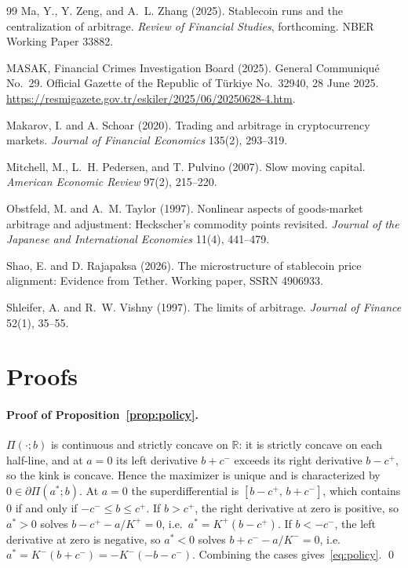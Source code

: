 \documentclass[12pt]{article}
\theoremstyle{definition}
\theoremstyle{remark}
\begin{document}
\begin{thebibliography}{99}
Ma, Y., Y. Zeng, and A.~L. Zhang (2025). Stablecoin runs and the centralization of arbitrage. \emph{Review of Financial Studies}, forthcoming. NBER Working Paper 33882.

MASAK, Financial Crimes Investigation Board (2025). General Communiqu\'e No.~29. Official Gazette of the Republic of T\"urkiye No.~32940, 28 June 2025. \url{https://resmigazete.gov.tr/eskiler/2025/06/20250628-4.htm}.

Makarov, I. and A. Schoar (2020). Trading and arbitrage in cryptocurrency markets. \emph{Journal of Financial Economics} 135(2), 293--319.

Mitchell, M., L.~H. Pedersen, and T. Pulvino (2007). Slow moving capital. \emph{American Economic Review} 97(2), 215--220.

Obstfeld, M. and A.~M. Taylor (1997). Nonlinear aspects of goods-market arbitrage and adjustment: Heckscher's commodity points revisited. \emph{Journal of the Japanese and International Economies} 11(4), 441--479.

Shao, E. and D. Rajapaksa (2026). The microstructure of stablecoin price alignment: Evidence from Tether. Working paper, SSRN 4906933.

Shleifer, A. and R.~W. Vishny (1997). The limits of arbitrage. \emph{Journal of Finance} 52(1), 35--55.

\end{thebibliography}


\newpage
\onehalfspacing
\appendix
\section{Proofs}\label{app:proofs}

\paragraph{Proof of Proposition~\ref{prop:policy}.}
$\Pi(\cdot;b)$ is continuous and strictly concave on $\mathbb R$: it is strictly concave on each half-line, and at $a=0$ its left derivative $b+c^-$ exceeds its right derivative $b-c^+$, so the kink is concave. Hence the maximizer is unique and is characterized by $0\in\partial\Pi(a^*;b)$. At $a=0$ the superdifferential is $[b-c^+,\,b+c^-]$, which contains $0$ if and only if $-c^-\le b\le c^+$. If $b>c^+$, the right derivative at zero is positive, so $a^*>0$ solves $b-c^+-a/K^+=0$, i.e.\ $a^*=K^+(b-c^+)$. If $b<-c^-$, the left derivative at zero is negative, so $a^*<0$ solves $b+c^--a/K^-=0$, i.e.\ $a^*=K^-(b+c^-)=-K^-(-b-c^-)$. Combining the cases gives~\eqref{eq:policy}. \qed
\end{document}
